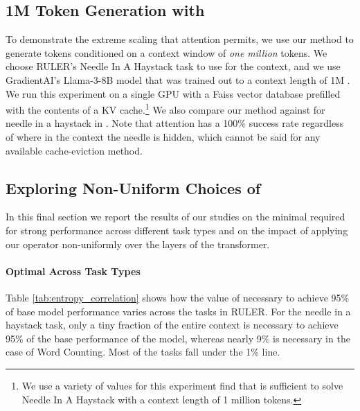 \subsection{1M Token Generation with \Topk}
To demonstrate the extreme scaling that \topk attention permits, we use our method to generate tokens conditioned on a context window of \textit{one million} tokens. We choose RULER's Needle In A Haystack task to use for the context, and we use GradientAI's Llama-3-8B model that was trained out to a context length of 1M \citep{gradient2024scaling}. We run this experiment on a single GPU with a Faiss vector database prefilled with the contents of a KV cache.\footnote{We use a variety of \kk values for this experiment find that  is sufficient to solve Needle In A Haystack with a context length of 1 million tokens.} We also compare our method against \cite{xiao2023streamingllm} for needle in a haystack in . Note that \topk attention has a 100\% success rate regardless of where in the context the needle is hidden, which cannot be said for any available cache-eviction method.

\subsection{Exploring Non-Uniform Choices of \kk}

In this final section we report the results of our studies on the minimal \kk required for strong performance across different task types and on the impact of applying our \topk operator non-uniformly over the layers of the transformer.

\paragraph{Optimal \kk Across Task Types}
Table \ref{tab:entropy_correlation} shows how the value of \kk necessary to achieve 95\% of base model performance varies across the tasks in RULER. For the needle in a haystack task, only a tiny fraction of the entire context is necessary to achieve 95\% of the base performance of the model, whereas nearly 9\% is necessary in the case of Word Counting. Most of the tasks fall under the 1\% line.

